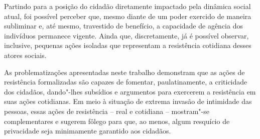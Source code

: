 Partindo para a posição do cidadão diretamente impactado pela dinâmica
social atual, foi possível perceber que, mesmo diante de um poder
exercido de maneira subliminar e, até mesmo, travestido de benefício, a
capacidade de agência dos indivíduos permanece vigente. Ainda que,
discretamente, já é possível observar, inclusive, pequenas ações
isoladas que representam a resistência cotidiana desses atores sociais.

As problematizações apresentadas neste trabalho demonstram que as ações
de resistência formalizadas são capazes de fomentar, paulatinamente, a
criticidade dos cidadãos, dando"-lhes subsídios e argumentos para
exercerem a resistência em suas ações cotidianas. Em meio à situação de
extrema invasão de intimidade das pessoas, essas ações de resistência --
real e cotidiana -- mostram"-se complementares e sugerem fôlego para que,
ao menos, algum resquício de privacidade seja minimamente garantido aos
cidadãos.


